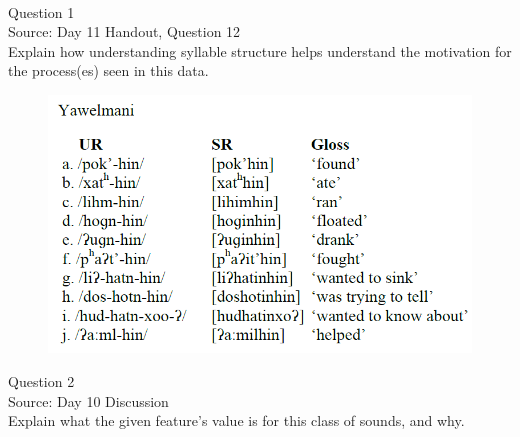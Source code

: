 \documentclass[12pt]{article}
\begin{document}
\begin{center}
\textbf{{\color{red}{\HUGE END OF EXAM}}}\\

\end{center}
\newpage

\begin{center}
\textbf{{\color{blue}{\HUGE START OF EXAM\\}}}

\textbf{{\color{blue}{\HUGE Student ID: 1794\\}}}

\textbf{{\color{blue}{\HUGE 12:10 - 12:30 PM\\}}}

\end{center}
\newpage

{\large Question 1}\\

Source: Day 11 Handout, Question 12\\

Explain how understanding syllable structure helps understand the motivation for the process(es) seen in this data.\\

\begin{figure}[H]
\includegraphics{../images/yawelmani.png}
\end{figure}

\newpage

{\large Question 2}\\

Source: Day 10 Discussion\\

Explain what the given feature’s value is for this class of sounds, and why.\\
\end{document}
